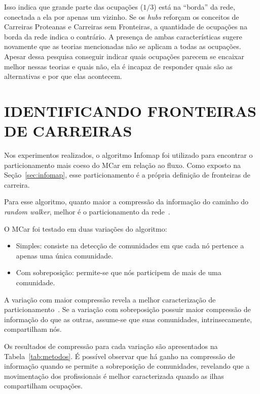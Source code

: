 \documentclass[12pt,a4paper]{article}
\begin{document}
Isso indica que grande parte das ocupações ($1/3$) está na \enquote{borda} da rede, conectada a ela por apenas um vizinho. Se os \textit{hubs} reforçam os conceitos de Carreiras Proteanas e Carreiras sem Fronteiras, a quantidade de ocupações na borda da rede indica o contrário. A presença de ambas características sugere novamente que as teorias mencionadas não se aplicam a todas as ocupações. Apesar dessa pesquisa conseguir indicar quais ocupações parecem se encaixar melhor nessas teorias e quais não, ela é incapaz de responder quais são as alternativas e por que elas acontecem.


\section{IDENTIFICANDO FRONTEIRAS DE CARREIRAS}  \label{sec:fronteiras-de-carreira}

Nos experimentos realizados, o algoritmo Infomap foi utilizado para encontrar o particionamento mais coeso do MCar em relação ao fluxo. Como exposto na Seção~\ref{sec:infomap}, esse particionamento é a própria definição de fronteiras de carreira.

Para esse algoritmo, quanto maior a compressão da informação do caminho do \textit{random walker}, melhor é o particionamento da rede~\cite{Rosvall2009-sd}.

O MCar foi testado em duas variações do algoritmo: 
\begin{itemize}
    \item Simples: consiste na detecção de comunidades em que cada nó pertence a apenas uma única comunidade. 
    \item Com sobreposição: permite-se que nós participem de mais de uma comunidade.
\end{itemize}

A variação com maior compressão revela a melhor caracterização de particionamento~\cite{Viamontes_Esquivel2011-it,Rosvall2011-yi,Edler2017-kt}. Se a variação com sobreposição possuir maior compressão de informação do que as outras, assume-se que suas comunidades, intrinsecamente, compartilham nós.

Os resultados de compressão para cada variação são apresentados na Tabela~\ref{tab:metodos}. É possível observar que há ganho na compressão de informação quando se permite a sobreposição de comunidades, revelando que a movimentação dos profissionais é melhor caracterizada quando as ilhas compartilham ocupações.
\end{document}
